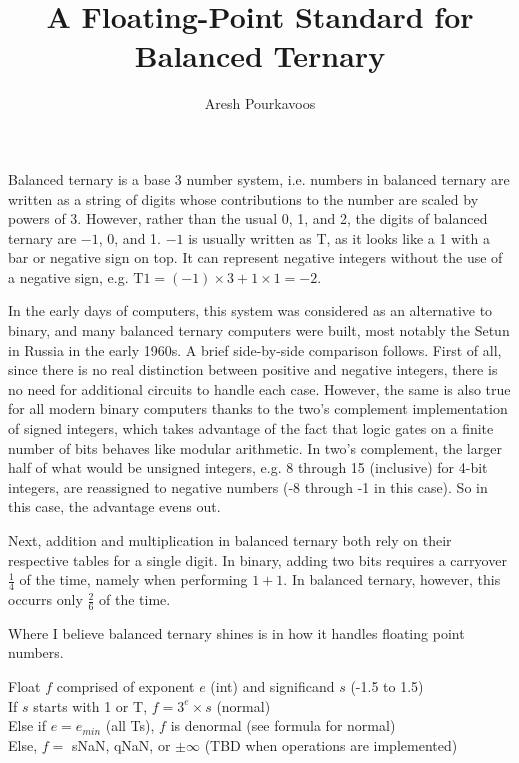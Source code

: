 \documentclass{article}
\begin{document}
\title{A Floating-Point Standard for Balanced Ternary}
\author{Aresh Pourkavoos}
\maketitle

\newcommand{\T}{\mathrm{T}}

Balanced ternary is a base 3 number system,
i.e. numbers in balanced ternary are written as a string of digits
whose contributions to the number are scaled by powers of 3.
However, rather than the usual 0, 1, and 2,
the digits of balanced ternary are $-1$, 0, and 1.
$-1$ is usually written as T, as it looks like a 1 with a bar or negative sign on top.
It can represent negative integers without the use of a negative sign,
e.g. $\T1 = (-1) \times 3 + 1 \times 1= -2$.

In the early days of computers,
this system was considered as an alternative to binary,
and many balanced ternary computers were built,
most notably the Setun in Russia in the early 1960s.
A brief side-by-side comparison follows.
First of all, since there is no real distinction between positive and negative integers,
there is no need for additional circuits to handle each case.
However, the same is also true for all modern binary computers
thanks to the two's complement implementation of signed integers,
which takes advantage of the fact that logic gates on a finite number of bits
behaves like modular arithmetic.
In two's complement, the larger half of what would be unsigned integers,
e.g. 8 through 15 (inclusive) for 4-bit integers,
are reassigned to negative numbers (-8 through -1 in this case).
So in this case, the advantage evens out.

Next, addition and multiplication in balanced ternary
both rely on their respective tables for a single digit.
In binary, adding two bits requires a carryover $\frac{1}{4}$ of the time,
namely when performing $1+1$.
In balanced ternary, however, this occurrs only $\frac{2}{6}$ of the time.


Where I believe balanced ternary shines is in how it handles floating point numbers.


Float $f$ comprised of exponent $e$ (int) and significand $s$ (-1.5 to 1.5) \\
If $s$ starts with 1 or T, $f = 3^e \times s$ (normal) \\
Else if $e=e_{min}$ (all Ts), $f$ is denormal (see formula for normal) \\
Else, $f =$ sNaN, qNaN, or $\pm\infty$ (TBD when operations are implemented)
\setlength{\tabcolsep}{5pt}
\renewcommand{\arraystretch}{1.25}
\end{document}
